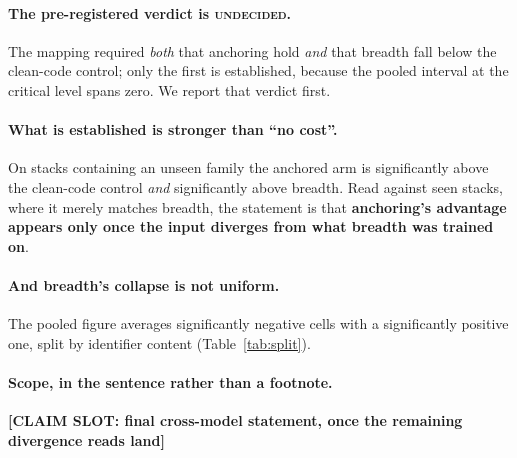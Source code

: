 \documentclass[sigconf,review,anonymous]{acmart}
\newcommand{\slot}[1]{\textbf{[CLAIM SLOT: #1]}}
\begin{document}
\begin{table}[t]\centering\small
\caption{The divergence ladder. Breadth's gain flips sign once the stack contains a family the
model has never seen; anchoring rises above the clean-code control.}
\label{tab:ladder}

\end{table}

\paragraph{The pre-registered verdict is \textsc{undecided}.} The mapping required \emph{both} that
anchoring hold \emph{and} that breadth fall below the clean-code control; only the first is
established, because the pooled interval at the critical level spans zero. We report that verdict
first.

\paragraph{What is established is stronger than ``no cost''.} On stacks containing an unseen family
the anchored arm is significantly above the clean-code control \emph{and} significantly above
breadth. Read against seen stacks, where it merely matches breadth, the statement is that
\textbf{anchoring's advantage appears only once the input diverges from what breadth was trained
on}.

\paragraph{And breadth's collapse is not uniform.} The pooled figure averages significantly negative
cells with a significantly positive one, split by identifier content (Table~\ref{tab:split}).

\begin{table}[t]\centering\small
\caption{The divergence result across models, at the critical level. All eight models are read.}
\label{tab:divmodels}

\end{table}

\paragraph{Scope, in the sentence rather than a footnote.} \slot{final cross-model statement, once
the remaining divergence reads land}

\end{document}
